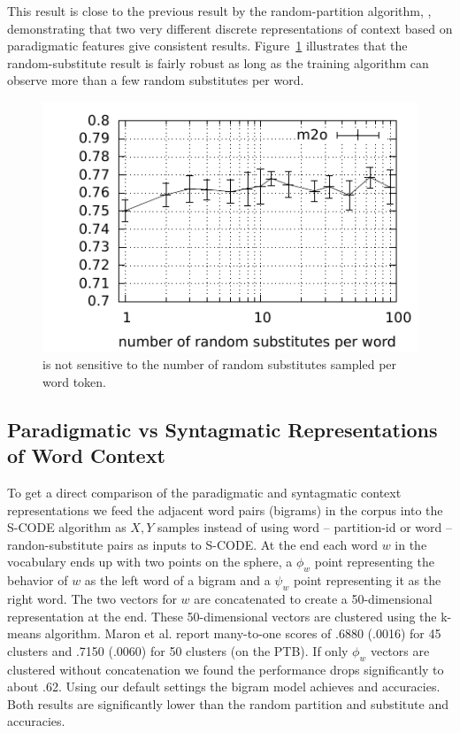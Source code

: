 This result is close to the previous result by the random-partition
algorithm, \rpmto, demonstrating that two very different discrete
representations of context based on paradigmatic features give
consistent results.  Figure~\ref{plot-s} illustrates that the
random-substitute result is fairly robust as long as the training
algorithm can observe more than a few random substitutes per word.

\begin{figure}[ht] \centering
\includegraphics[width=0.5\linewidth]{plot-s.pdf}
\caption{\mto is not sensitive to the number of random substitutes
  sampled per word token.}
\label{plot-s}
\end{figure}

\subsection{Paradigmatic vs Syntagmatic Representations of Word Context}\label{sec:bigram}

To get a direct comparison of the paradigmatic and syntagmatic context
representations we feed the adjacent word pairs (bigrams) in the
corpus into the S-CODE algorithm as $X, Y$ samples
\cite{maron2010sphere} instead of using word -- partition-id or word
-- randon-substitute pairs as inputs to S-CODE.  At the end each word
$w$ in the vocabulary ends up with two points on the sphere, a
$\phi_w$ point representing the behavior of $w$ as the left word of a
bigram and a $\psi_w$ point representing it as the right word.  The
two vectors for $w$ are concatenated to create a 50-dimensional
representation at the end.  These 50-dimensional vectors are clustered
using the k-means algorithm.  Maron et al. 
report many-to-one scores of .6880 (.0016) for 45 clusters and .7150
(.0060) for 50 clusters (on the PTB).  If only $\phi_w$ vectors are
clustered without concatenation we found the performance drops
significantly to about .62.  Using our default settings the bigram
model achieves \bgmto \mto and \bgvm \vm accuracies.  Both results are
significantly lower than the random partition and substitute \mto and
\vm accuracies.
